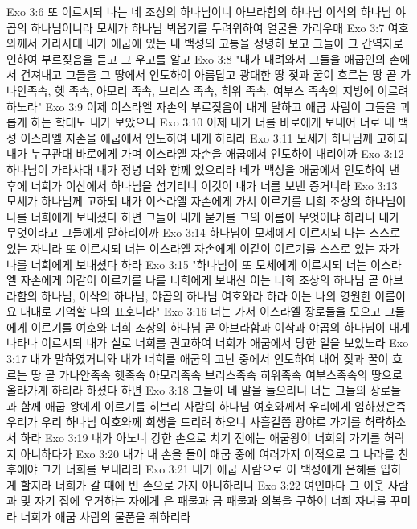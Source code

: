 Exo 3:6  또 이르시되 나는 네 조상의 하나님이니 아브라함의 하나님 이삭의 하나님 야곱의 하나님이니라 모세가 하나님 뵈옵기를 두려워하여 얼굴을 가리우매
Exo 3:7  여호와께서 가라사대 내가 애굽에 있는 내 백성의 고통을 정녕히 보고 그들이 그 간역자로 인하여 부르짖음을 듣고 그 우고를 알고
Exo 3:8  "내가 내려와서 그들을 애굽인의 손에서 건져내고 그들을 그 땅에서 인도하여 아름답고 광대한 땅 젖과 꿀이 흐르는 땅 곧 가나안족속, 헷 족속, 아모리 족속, 브리스 족속, 히위 족속, 여부스 족속의 지방에 이르려 하노라"
Exo 3:9  이제 이스라엘 자손의 부르짖음이 내게 달하고 애굽 사람이 그들을 괴롭게 하는 학대도 내가 보았으니
Exo 3:10  이제 내가 너를 바로에게 보내어 너로 내 백성 이스라엘 자손을 애굽에서 인도하여 내게 하리라
Exo 3:11  모세가 하나님께 고하되 내가 누구관대 바로에게 가며 이스라엘 자손을 애굽에서 인도하여 내리이까
Exo 3:12  하나님이 가라사대 내가 정녕 너와 함께 있으리라 네가 백성을 애굽에서 인도하여 낸 후에 너희가 이산에서 하나님을 섬기리니 이것이 내가 너를 보낸 증거니라
Exo 3:13  모세가 하나님께 고하되 내가 이스라엘 자손에게 가서 이르기를 너희 조상의 하나님이 나를 너희에게 보내셨다 하면 그들이 내게 묻기를 그의 이름이 무엇이냐 하리니 내가 무엇이라고 그들에게 말하리이까
Exo 3:14  하나님이 모세에게 이르시되 나는 스스로 있는 자니라 또 이르시되 너는 이스라엘 자손에게 이같이 이르기를 스스로 있는 자가 나를 너희에게 보내셨다 하라
Exo 3:15  "하나님이 또 모세에게 이르시되 너는 이스라엘 자손에게 이같이 이르기를 나를 너희에게 보내신 이는 너희 조상의 하나님 곧 아브라함의 하나님, 이삭의 하나님, 야곱의 하나님 여호와라 하라 이는 나의 영원한 이름이요 대대로 기억할 나의 표호니라"
Exo 3:16  너는 가서 이스라엘 장로들을 모으고 그들에게 이르기를 여호와 너희 조상의 하나님 곧 아브라함과 이삭과 야곱의 하나님이 내게 나타나 이르시되 내가 실로 너희를 권고하여 너희가 애굽에서 당한 일을 보았노라
Exo 3:17  내가 말하였거니와 내가 너희를 애굽의 고난 중에서 인도하여 내어 젖과 꿀이 흐르는 땅 곧 가나안족속 헷족속 아모리족속 브리스족속 히위족속 여부스족속의 땅으로 올라가게 하리라 하셨다 하면
Exo 3:18  그들이 네 말을 들으리니 너는 그들의 장로들과 함께 애굽 왕에게 이르기를 히브리 사람의 하나님 여호와께서 우리에게 임하셨은즉 우리가 우리 하나님 여호와께 희생을 드리려 하오니 사흘길쯤 광야로 가기를 허락하소서 하라
Exo 3:19  내가 아노니 강한 손으로 치기 전에는 애굽왕이 너희의 가기를 허락지 아니하다가
Exo 3:20  내가 내 손을 들어 애굽 중에 여러가지 이적으로 그 나라를 친 후에야 그가 너희를 보내리라
Exo 3:21  내가 애굽 사람으로 이 백성에게 은혜를 입히게 할지라 너희가 갈 때에 빈 손으로 가지 아니하리니
Exo 3:22  여인마다 그 이웃 사람과 및 자기 집에 우거하는 자에게 은 패물과 금 패물과 의복을 구하여 너희 자녀를 꾸미라 너희가 애굽 사람의 물품을 취하리라
